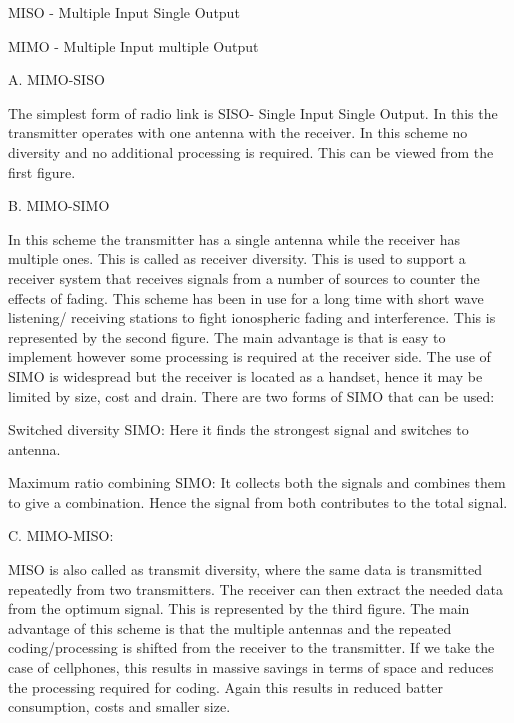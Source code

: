 	MISO - Multiple Input Single Output

	MIMO - Multiple Input multiple Output



 






































A. MIMO-SISO 


The simplest form of radio link is SISO- Single Input Single Output. In this the transmitter operates with one antenna with the receiver. In this scheme no diversity and no additional processing is required. This can be viewed from the first figure.

B. MIMO-SIMO

In this scheme the transmitter has a single antenna while the receiver has multiple ones. This is called as receiver diversity. This is used to support a receiver system that receives signals from a number of sources to counter the effects of fading. This scheme has been in use for a long time with short wave listening/ receiving stations to fight ionospheric fading and interference. This is represented by the second figure. The main advantage is that is easy to implement however some processing is required at the receiver side. The use of SIMO is widespread but the receiver is located as a handset, hence it may be limited by size, cost and drain. There are two forms of SIMO that can be used:

	Switched diversity SIMO: Here it finds the strongest signal and switches to antenna.

	Maximum ratio combining SIMO: It collects both the signals and combines them to give a combination. Hence the signal from both contributes to the total signal.

C. MIMO-MISO:

MISO is also called as transmit diversity, where the same data is transmitted repeatedly from two transmitters. The receiver can then extract the needed data from the optimum signal. This is represented by the third figure. The main advantage of this scheme is that the multiple antennas and the repeated coding/processing is shifted from the receiver to the transmitter. If we take the case of cellphones, this results in massive savings in terms of space and reduces the processing required for coding. Again this results in reduced batter consumption, costs and smaller size.


